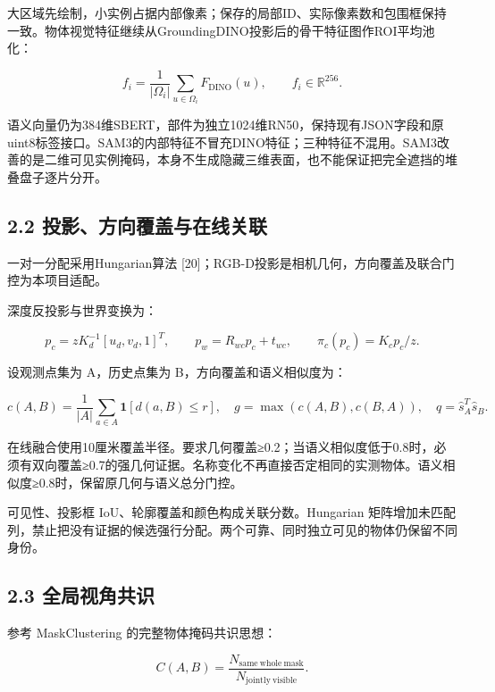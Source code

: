 \documentclass[UTF8,fontset=fandol]{ctexart}
\begin{document}
大区域先绘制，小实例占据内部像素；保存的局部ID、实际像素数和包围框保持一致。物体视觉特征继续从GroundingDINO投影后的骨干特征图作ROI平均池化：



\[
f_i=\frac{1}{|\Omega_i|}\sum_{u\in\Omega_i}F_{\mathrm{DINO}}(u),\qquad f_i\in\mathbb R^{256}.
\]

语义向量仍为384维SBERT，部件为独立1024维RN50，保持现有JSON字段和原uint8标签接口。SAM3的内部特征不冒充DINO特征；三种特征不混用。SAM3改善的是二维可见实例掩码，本身不生成隐藏三维表面，也不能保证把完全遮挡的堆叠盘子逐片分开。



\subsection*{2.2 投影、方向覆盖与在线关联}

一对一分配采用Hungarian算法 [20]；RGB-D投影是相机几何，方向覆盖及联合门控为本项目适配。



深度反投影与世界变换为：



\[
p_c=zK_d^{-1}[u_d,v_d,1]^T,\qquad p_w=R_{wc}p_c+t_{wc},\qquad \pi_c(p_c)=K_cp_c/z.
\]

设观测点集为 A，历史点集为 B，方向覆盖和语义相似度为：



\[
c(A,B)=\frac{1}{|A|}\sum_{a\in A}\mathbf1[d(a,B)\le r],\quad
g=\max(c(A,B),c(B,A)),\quad q=\hat s_A^T\hat s_B.
\]

在线融合使用10厘米覆盖半径。要求几何覆盖≥0.2；当语义相似度低于0.8时，必须有双向覆盖≥0.7的强几何证据。名称变化不再直接否定相同的实测物体。语义相似度≥0.8时，保留原几何与语义总分门控。



可见性、投影框 IoU、轮廓覆盖和颜色构成关联分数。Hungarian 矩阵增加未匹配列，禁止把没有证据的候选强行分配。两个可靠、同时独立可见的物体仍保留不同身份。



\subsection*{2.3 全局视角共识}

参考 MaskClustering 的完整物体掩码共识思想：



\[
C(A,B)=\frac{N_{\mathrm{same\ whole\ mask}}}{N_{\mathrm{jointly\ visible}}}.
\]
\end{document}
